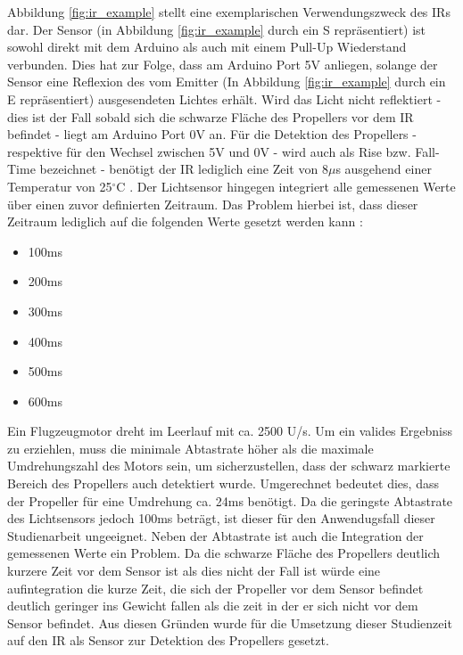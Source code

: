 Abbildung \ref{fig:ir_example} stellt eine exemplarischen Verwendungszweck des \ac{IR}s dar. 
Der Sensor (in Abbildung \ref{fig:ir_example} durch ein S repräsentiert) ist sowohl direkt mit dem Arduino als auch mit einem Pull-Up Wiederstand verbunden.
Dies hat zur Folge, dass am Arduino Port 5V anliegen, solange der Sensor eine Reflexion des vom Emitter (In Abbildung \ref{fig:ir_example} durch ein E repräsentiert) ausgesendeten Lichtes erhält.
Wird das Licht nicht reflektiert - dies ist der Fall sobald sich die schwarze Fläche des Propellers vor dem \ac{IR} befindet - liegt am Arduino Port 0V an.
Für die Detektion des Propellers - respektive für den Wechsel zwischen 5V und 0V - wird auch als Rise bzw. Fall-Time bezeichnet - benötigt der \ac{IR} lediglich eine Zeit von 8$\mu$s ausgehend einer Temperatur von 25$^\circ$C \cite[S.2]{ir_datasheet}.
Der Lichtsensor hingegen integriert alle gemessenen Werte über einen zuvor definierten Zeitraum. Das Problem hierbei ist, dass dieser Zeitraum lediglich auf die folgenden Werte gesetzt werden kann \cite[S.13]{tsl2591_datasheet}:
\begin{itemize}
	\item 100ms
	\item 200ms
	\item 300ms
	\item 400ms
	\item 500ms
	\item 600ms
\end{itemize}
Ein Flugzeugmotor dreht im Leerlauf mit ca. 2500 U/s. Um ein valides Ergebniss zu erziehlen, muss die minimale Abtastrate höher als die maximale Umdrehungszahl des Motors sein, um sicherzustellen, dass der schwarz markierte Bereich des Propellers auch detektiert wurde.
Umgerechnet bedeutet dies, dass der Propeller für eine Umdrehung ca. 24ms benötigt.
Da die geringste Abtastrate des Lichtsensors jedoch 100ms beträgt, ist dieser für den Anwendugsfall dieser Studienarbeit ungeeignet.
Neben der Abtastrate ist auch die Integration der gemessenen Werte ein Problem. 
Da die schwarze Fläche des Propellers deutlich kurzere Zeit vor dem Sensor ist als dies nicht der Fall ist würde eine aufintegration die kurze Zeit, die sich der Propeller vor dem Sensor befindet deutlich geringer ins Gewicht fallen als die zeit in der er sich nicht vor dem Sensor befindet.
Aus diesen Gründen wurde für die Umsetzung dieser Studienzeit auf den \ac{IR} als Sensor zur Detektion des Propellers gesetzt.



